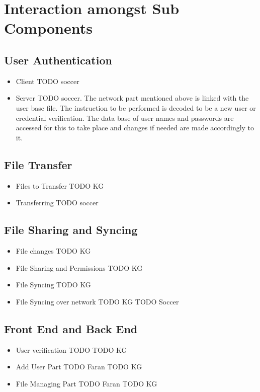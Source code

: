\documentclass{article}
\begin{document}
	\section{Interaction amongst Sub Components}
			\subsection{User Authentication}
				\begin{itemize}
					\item Client
						TODO soccer
					\item Server
						TODO soccer.
						\newline
						The network part mentioned above is linked with the user base file. The instruction to be performed is decoded to be a new user or credential verification. The data base of user names and passwords are accessed for this to take place and changes if needed are made accordingly to it.
				\end{itemize}
			\subsection{File Transfer}
				\begin{itemize}
					\item Files to Transfer
						TODO KG
					\item Transferring
						TODO soccer
				\end{itemize}	
			\subsection{File Sharing and Syncing}
				\begin{itemize}
					\item File changes
						TODO KG
					\item File Sharing and Permissions
						TODO KG
					\item File Syncing
						TODO KG
					\item File Syncing over network
						TODO KG
						TODO Soccer
				\end{itemize}
			\subsection{Front End and Back End}
				\begin{itemize}
					\item User verification
						TODO 
						TODO KG
					\item Add User Part
						TODO Faran
						TODO KG
					\item File Managing Part
						TODO Faran
						TODO KG			
				\end{itemize}
\end{document}
